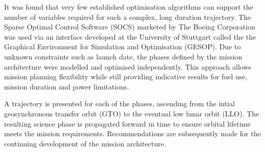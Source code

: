 It was found that very few established optimisation algorithms can support the number of variables required for such a complex, long duration trajectory. The Sparse Optimal Control Software (SOCS) marketed by The Boeing Corporation was used via an interface developed at the University of Stuttgart called the the Graphical Environment for Simulation and Optimisation (GESOP). Due to unknown constraints such as launch date, the phases defined by the mission architecture were modelled and optimised independently. This approach allows mission planning flexibility while still providing indicative results for fuel use, mission duration and power limitations.

A trajectory is presented for each of the phases, ascending from the intial geosynchronous transfer orbit (GTO) to the eventual low lunar orbit (LLO). The resulting science phase is propagated forward in time to ensure orbital lifetime meets the mission requirements. Recommendations are subsequently made for the continuing development of the mission architecture.

\vfill